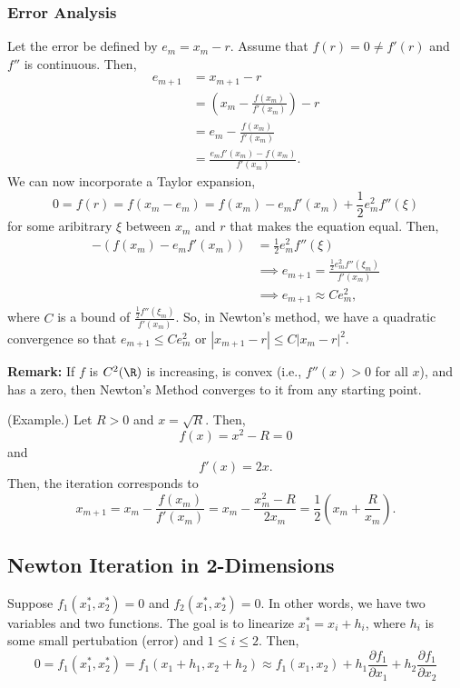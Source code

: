 \documentclass[letterpaper]{article}
\begin{document}
\subsubsection{Error Analysis}
Let the error be defined by $e_m = x_m - r$. Assume that $f(r) = 0 \neq f'(r)$ and $f''$ is continuous. Then, 
\[\begin{aligned}
    e_{m + 1} &= x_{m + 1} - r \\ 
        &= \left(x_m - \frac{f(x_m)}{f'(x_m)}\right) - r \\
        &= e_m - \frac{f(x_m)}{f'(x_m)} \\ 
        &= \frac{e_m f'(x_m) - f(x_m)}{f'(x_m)}.
\end{aligned}\]
We can now incorporate a Taylor expansion, 
\[0 = f(r) = f(x_m - e_m) = f(x_m) - e_m f'(x_m) + \frac{1}{2}e_m^2 f''(\xi)\]
for some aribitrary $\xi$ between $x_m$ and $r$ that makes the equation equal. Then, 
\begin{equation*}
    \begin{aligned}
        -(f(x_m) - e_m f'(x_m)) &= \frac{1}{2}e_m^2 f''(\xi) \\ 
            &\implies e_{m + 1} = \frac{\frac{1}{2} e_m^2 f''(\xi_m)}{f'(x_m)} \\ 
            &\implies e_{m + 1} \approx Ce_m^2,
    \end{aligned}
\end{equation*}
where $C$ is a bound of $\frac{\frac{1}{2} f''(\xi_m)}{f'(x_m)}$. So, in Newton's method, we have a quadratic convergence so that $e_{m + 1} \leq Ce_m^2$ or $|x_{m + 1} - r| \leq C |x_m - r|^2.$ 

\bigskip 

\textbf{Remark:} If $f$ is $C^2 (\R)$ is increasing, is convex (i.e., $f''(x) > 0$ for all $x$), and has a zero, then Newton's Method converges to it from any starting point.

\begin{mdframed}
    (Example.) Let $R > 0$ and $x = \sqrt{R}$. Then, 
    \[f(x) = x^2 - R = 0\] and \[f'(x) = 2x.\] Then, the iteration corresponds to \[x_{m + 1} = x_m - \frac{f(x_m)}{f'(x_m)} = x_m - \frac{x_m^2 - R}{2x_m} = \frac{1}{2}\left(x_m + \frac{R}{x_m}\right).\] 
\end{mdframed}

\subsection{Newton Iteration in 2-Dimensions}
Suppose $f_{1}(x_1^*, x_2^*) = 0$ and $f_{2}(x_1^*, x_2^*) = 0$. In other words, we have two variables and two functions. The goal is to linearize $x_1^* = x_i + h_i$, where $h_i$ is some small pertubation (error) and $1 \leq i \leq 2$. Then,
\[0 = f_{1}(x_1^*, x_2^*) = f_{1}(x_1 + h_1, x_2 + h_2) \approx f_{1}(x_1, x_2) + h_1 \frac{\partial f_1}{\partial x_1} + h_2 \frac{\partial f_1}{\partial x_2}\]
\end{document}

